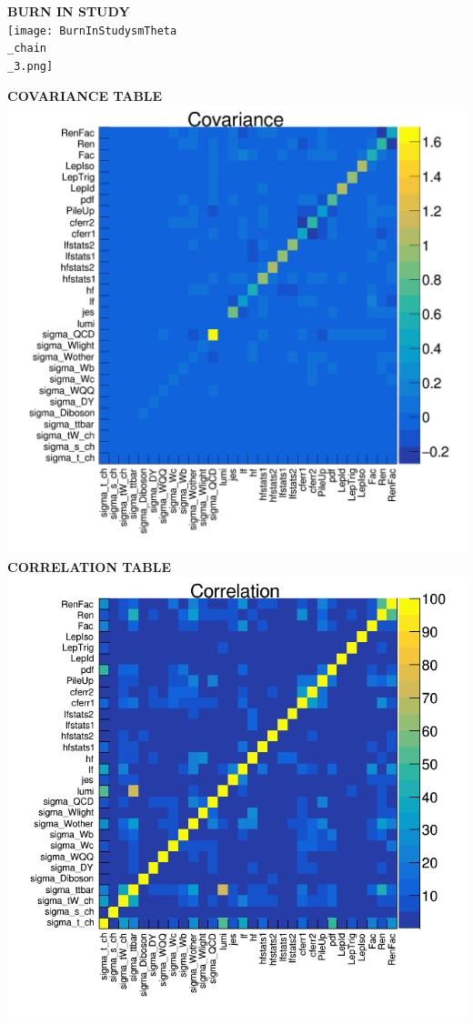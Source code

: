 \documentclass{article}
\begin{document}
\begin{tiny}
 \newpage 

 \textbf{BURN IN STUDY} \\ 
 \texttt{[image: BurnInStudysmTheta\\\_chain\\\_3.png]} 
 \newpage 

 \textbf{COVARIANCE TABLE} \\ 
 \includegraphics[width=0.7\linewidth]{Covsm.png} 
 \\ \textbf{CORRELATION TABLE} \\ 
 \includegraphics[width=0.7\linewidth]{Corsm.png} 
 \newpage 


\end{tiny}
\end{document}
